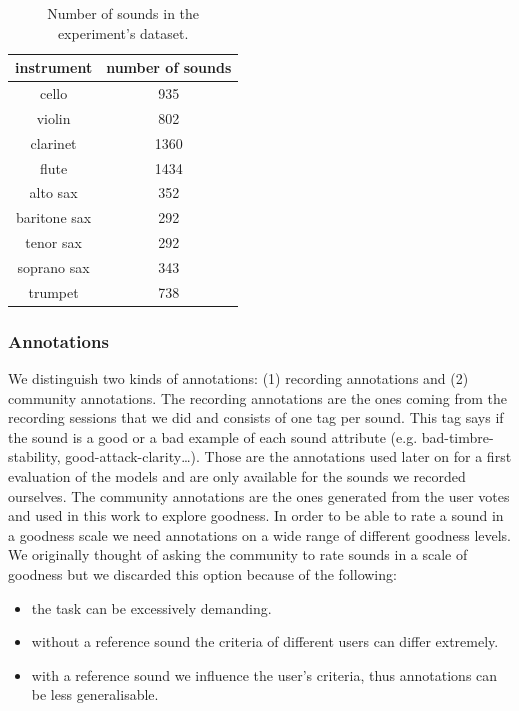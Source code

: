 \documentclass{article}
\begin{document}
\begin{table}[ht]
\centering
\begin{tabular}{cc}
\hline
instrument   & number of sounds \\ \hline
cello        & 935              \\
violin       & 802              \\
clarinet     & 1360             \\
flute        & 1434             \\
alto sax     & 352              \\
baritone sax & 292              \\
tenor sax    & 292              \\
soprano sax  & 343              \\
trumpet      & 738              \\ \hline
\end{tabular}
\caption{Number of sounds in the experiment's dataset.}
\label{sounds}
\end{table}

\subsubsection{Annotations}
We distinguish two kinds of annotations: (1) recording annotations and (2) community annotations. The recor\-ding annotations are the ones coming from the recording sessions that we did and consists of one tag per sound. This tag says if the sound is a good or a bad example of each sound attribute (e.g. bad-timbre-stability, good-attack-clarity…). Those are the annotations used later on for a first evaluation of the models and are only available for the sounds we recorded ourselves.
The community annotations are the ones generated from the user votes and used in this work to explore goodness. In order to be able to rate a sound in a goodness scale we need annotations on a wide range of different goodness levels. We originally thought of asking the community to rate sounds in a scale of goodness but we discarded this option because of the following:

\begin{itemize}
	\item{the task can be excessively demanding.}
	\item{without a reference sound the criteria of different users can differ extremely.}
	\item{with a reference sound we influence the user’s criteria, thus annotations can be less 	generalisable.}
\end{itemize}
\end{document}
